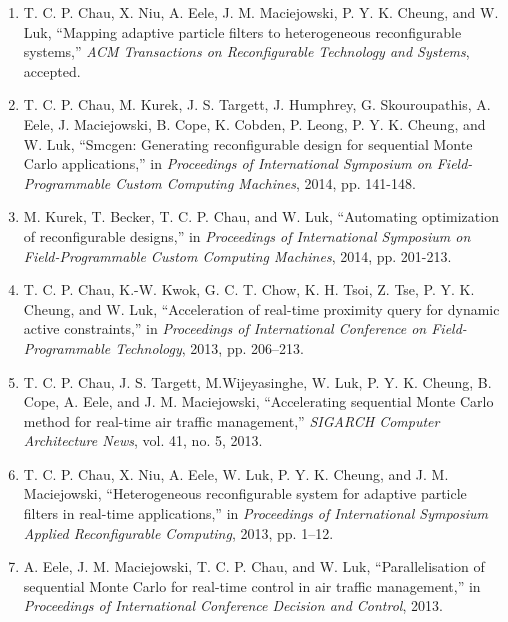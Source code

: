 
\cleardoublepage

{}

\begin{publications}

%
\begin{enumerate}[I]
\item T. C. P. Chau, X. Niu, A. Eele, J. M. Maciejowski, P. Y. K. Cheung, and W. Luk, ``Mapping adaptive particle ﬁlters to heterogeneous reconﬁgurable systems,'' \textit{ACM Transactions on Reconﬁgurable Technology and Systems}, accepted.
\item T. C. P. Chau, M. Kurek, J. S. Targett, J. Humphrey, G. Skouroupathis, A. Eele, J. Maciejowski, B. Cope, K. Cobden, P. Leong, P. Y. K. Cheung, and W. Luk, ``Smcgen: Generating reconfigurable design for sequential Monte Carlo applications,'' in \textit{Proceedings of International Symposium on Field-Programmable Custom Computing Machines}, 2014, pp. 141-148.
\item M. Kurek, T. Becker, T. C. P. Chau, and W. Luk, ``Automating optimization of reconfigurable designs,'' in \textit{Proceedings of International Symposium on Field-Programmable Custom Computing Machines}, 2014, pp. 201-213.
\item T. C. P. Chau, K.-W. Kwok, G. C. T. Chow, K. H. Tsoi, Z. Tse, P. Y. K. Cheung, and W. Luk, ``Acceleration of real-time proximity query for dynamic active constraints,'' in \textit{Proceedings of International Conference on Field-Programmable Technology}, 2013, pp. 206–213.
\item T. C. P. Chau, J. S. Targett, M.Wijeyasinghe, W. Luk, P. Y. K. Cheung, B. Cope, A. Eele, and J. M. Maciejowski, ``Accelerating sequential Monte Carlo method for real-time air traffic management,'' \textit{SIGARCH Computer Architecture News}, vol. 41, no. 5, 2013.
\item T. C. P. Chau, X. Niu, A. Eele, W. Luk, P. Y. K. Cheung, and J. M. Maciejowski, ``Heterogeneous reconfigurable system for adaptive particle filters in real-time applications,'' in \textit{Proceedings of International Symposium Applied Reconfigurable Computing}, 2013, pp. 1–12.
\item A. Eele, J. M. Maciejowski, T. C. P. Chau, and W. Luk, ``Parallelisation of sequential Monte Carlo for real-time control in air traffic management,'' in \textit{Proceedings of International Conference Decision and Control}, 2013.

\end{enumerate}
\end{publications}
